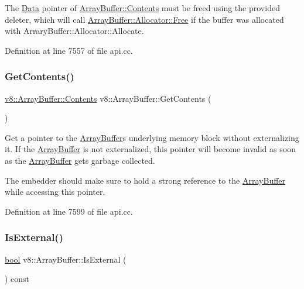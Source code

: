 The \mbox{\hyperlink{classv8_1_1Data}{Data}} pointer of \mbox{\hyperlink{classv8_1_1ArrayBuffer_1_1Contents}{Array\+Buffer\+::\+Contents}} must be freed using the provided deleter, which will call \mbox{\hyperlink{classv8_1_1ArrayBuffer_1_1Allocator_a419f59d2a103a5a8863809d7977c9cd8}{Array\+Buffer\+::\+Allocator\+::\+Free}} if the buffer was allocated with Arrary\+Buffer\+::\+Allocator\+::\+Allocate. 

Definition at line 7557 of file api.\+cc.

\mbox{\label{classv8_1_1ArrayBuffer_acd2e6bfb9068ba3a692162f312c47154}} 
\subsubsection{\texorpdfstring{Get\+Contents()}{GetContents()}}
{\footnotesize\ttfamily \mbox{\hyperlink{classv8_1_1ArrayBuffer_1_1Contents}{v8\+::\+Array\+Buffer\+::\+Contents}} v8\+::\+Array\+Buffer\+::\+Get\+Contents (\begin{DoxyParamCaption}{ }\end{DoxyParamCaption})}

Get a pointer to the \mbox{\hyperlink{classv8_1_1ArrayBuffer}{Array\+Buffer}}\textquotesingle{}s underlying memory block without externalizing it. If the \mbox{\hyperlink{classv8_1_1ArrayBuffer}{Array\+Buffer}} is not externalized, this pointer will become invalid as soon as the \mbox{\hyperlink{classv8_1_1ArrayBuffer}{Array\+Buffer}} gets garbage collected.

The embedder should make sure to hold a strong reference to the \mbox{\hyperlink{classv8_1_1ArrayBuffer}{Array\+Buffer}} while accessing this pointer. 

Definition at line 7599 of file api.\+cc.

\mbox{\label{classv8_1_1ArrayBuffer_a22ecea76af2257b12bdb69b40d9bec8f}} 
\subsubsection{\texorpdfstring{Is\+External()}{IsExternal()}}
{\footnotesize\ttfamily \mbox{\hyperlink{classbool}{bool}} v8\+::\+Array\+Buffer\+::\+Is\+External (\begin{DoxyParamCaption}{ }\end{DoxyParamCaption}) const}

